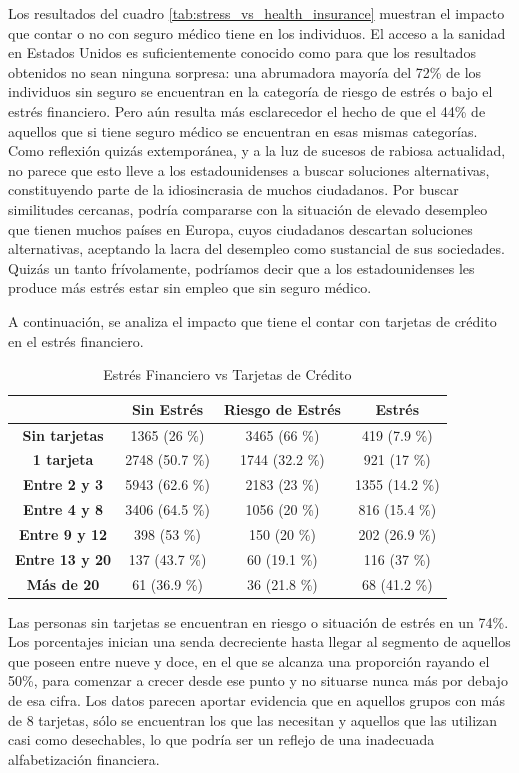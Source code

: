 \documentclass[a4paper, 11pt]{article}
\begin{document}
Los resultados del cuadro \ref{tab:stress_vs_health_insurance} muestran el 
impacto que contar o no con seguro médico tiene en los individuos. El acceso a
la sanidad en Estados Unidos es suficientemente conocido como para que los 
resultados obtenidos no sean ninguna sorpresa: una abrumadora mayoría del 72\%
de los individuos sin seguro se encuentran en la categoría de riesgo de estrés
o bajo el estrés financiero. Pero aún resulta más esclarecedor el hecho de que 
el 44\% de aquellos que si tiene seguro médico se encuentran en esas mismas 
categorías. Como reflexión quizás extemporánea, y a la luz de sucesos de 
rabiosa actualidad, no parece que esto lleve a los estadounidenses a buscar
soluciones alternativas, constituyendo parte de la idiosincrasia de muchos 
ciudadanos. Por buscar similitudes cercanas, podría compararse con la situación
de elevado desempleo que tienen muchos países en Europa, cuyos ciudadanos descartan
soluciones alternativas, aceptando la lacra del desempleo como sustancial de sus
sociedades. Quizás un tanto frívolamente, podríamos decir que a los estadounidenses
les produce más estrés estar sin empleo que sin seguro médico.

A continuación, se analiza el impacto que tiene el contar con tarjetas de crédito
en el estrés financiero. 

\begin{table}[ht]
\centering
\begin{tabular}{cccc}
\toprule
 & \textbf{Sin Estrés} & \textbf{Riesgo de Estrés} & \textbf{Estrés}\\
\midrule
\textbf{Sin tarjetas } & 1365 (26 \%) &	3465 (66 \%) &	419 (7.9 \%) \\
\textbf{1 tarjeta} & 2748 (50.7 \%) &	1744 (32.2 \%) &	921 (17 \%)\\
\textbf{Entre 2 y 3 } & 5943 (62.6 \%) &	2183 (23 \%) &	1355 (14.2 \%)\\
\textbf{Entre 4 y 8 } & 3406 (64.5 \%) &	1056 (20 \%) &	816 (15.4 \%)\\
\textbf{Entre 9 y 12} & 398 (53 \%) &	150 (20 \%) &	202 (26.9 \%)\\
\textbf{Entre 13 y 20} & 137 (43.7 \%) &	60 (19.1 \%) &	116 (37 \%) \\
\textbf{Más de 20} & 61 (36.9 \%) &	36 (21.8 \%) &	68 (41.2 \%)\\
\bottomrule
\end{tabular}
\caption{Estrés Financiero vs Tarjetas de Crédito}
\label{tab:stress_vs_credit_card}
\end{table}
Las personas sin tarjetas se encuentran en riesgo o situación de estrés en
un 74\%. Los porcentajes inician una senda decreciente hasta llegar al 
segmento de aquellos que poseen entre nueve y doce, en el que se alcanza una 
proporción rayando el 50\%, para comenzar a crecer desde ese punto y no 
situarse nunca más por debajo de esa cifra. Los datos parecen aportar evidencia
que en aquellos grupos con más de 8 tarjetas, sólo se encuentran los que las 
necesitan y aquellos que las utilizan casi como desechables, lo que podría ser
un reflejo de una inadecuada alfabetización financiera.
\end{document}
